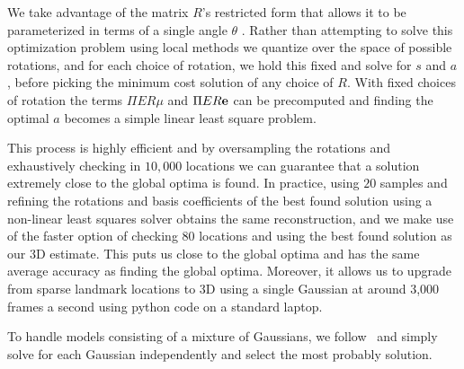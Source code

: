 \documentclass[10pt,twocolumn,letterpaper]{article}
\begin{document}
We take advantage of the matrix $R$'s restricted form that allows it
to be parameterized in terms of a single angle $\theta$%
. Rather than attempting to solve this optimization
problem using local  methods we quantize over the space
of possible rotations, and for each choice of rotation, we hold this
fixed and solve for $s$ and $a$, before picking the minimum cost
solution of any choice of $R$. With fixed choices of rotation the
terms $\Pi E R \mu$ and $\Pi E R \bf e$ can be precomputed and
finding the optimal $a$ becomes a simple linear least square problem.

This process is highly efficient and by oversampling the rotations
and exhaustively checking in $10,000$ locations we can guarantee that
a solution extremely close to the global optima is found. In
practice, using $20$ samples and refining the rotations and basis
coefficients of the best found solution using a non-linear least
squares solver obtains the same reconstruction, and we make use of the
faster option of checking $80$ locations and using the best found
solution as our 3D estimate. This puts us close to the global optima
and has the same average accuracy as finding the global
optima. Moreover, it allows us to upgrade from sparse landmark locations
to 3D using a single Gaussian at around 3,000 frames a second using
python code on a standard laptop.

To handle models consisting of a mixture of Gaussians, we follow~\cite{pitelis2013learning} and simply solve
for each Gaussian independently and select the most probably solution.
%
%
\end{document}
